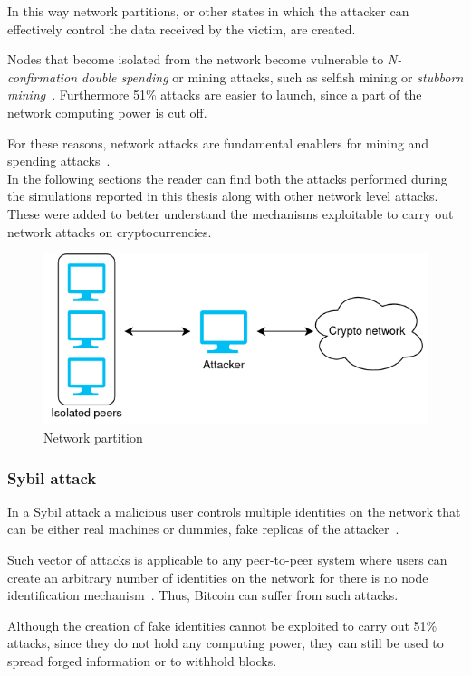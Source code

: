 \documentclass[12pt, letterpaper, twoside]{article}
\begin{document}
In this way network partitions, or other states in which the attacker can effectively control the data received by the victim, are created.

Nodes that become isolated from the network become vulnerable to \textit{N-confirmation double spending} or mining attacks, such as selfish mining or \textit{stubborn mining}~\cite{stubborn}. Furthermore 51\% attacks are easier to launch, since a part of the network computing power is cut off. 

For these reasons, network attacks are fundamental enablers for mining and spending attacks~\cite{dotan2020surveychallenges}.\\

In the following sections the reader can find both the attacks performed during the simulations reported in this thesis along with other network level attacks. These were added to better understand the mechanisms exploitable to carry out network attacks on cryptocurrencies.

\begin{figure}[h!]
	\includegraphics[width=.55\textwidth]{pict/network-partition.png}
	\centering
	\caption{Network partition}
	\label{fig:net-part}
\end{figure}


\subsubsection{Sybil attack}\label{sec:sybil}
In a Sybil attack a malicious user controls multiple identities on the network that can be either real machines or dummies, fake replicas of the attacker~\cite{douceur2002sybil}.

Such vector of attacks is applicable to any peer-to-peer system where users can create an arbitrary number of identities on the network for there is no node identification mechanism~\cite{kedziora-sybil-ledgers}. Thus, Bitcoin can suffer from such attacks.

Although the creation of fake identities cannot be exploited to carry out 51\% attacks, since they do not hold any computing power, they can still be used to spread forged information or to withhold blocks.
\end{document}
